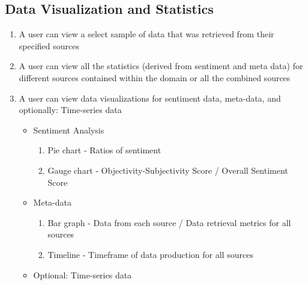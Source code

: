 \documentclass[12pt]{article}
\begin{document}
\subsection{Data Visualization and Statistics}
\begin{enumerate}
  \item A user can view a select sample of data that was retrieved from their specified sources
  \item A user can view all the statistics (derived from sentiment and meta data) for different sources contained within the domain or all the combined sources
  \item A user can view data visualizations for sentiment data, meta-data, and optionally: Time-series data
  \begin{itemize}
    \item Sentiment Analysis
    \begin{enumerate}
      \item Pie chart - Ratios of sentiment
      \item Gauge chart - Objectivity-Subjectivity Score / Overall Sentiment Score
    \end{enumerate}
    \item Meta-data
    \begin{enumerate}
      \item Bar graph - Data from each source / Data retrieval metrics for all sources
      \item Timeline - Timeframe of data production for all sources
    \end{enumerate}
    \item Optional: Time-series data
  \end{itemize}
\end{enumerate}
\end{document}
